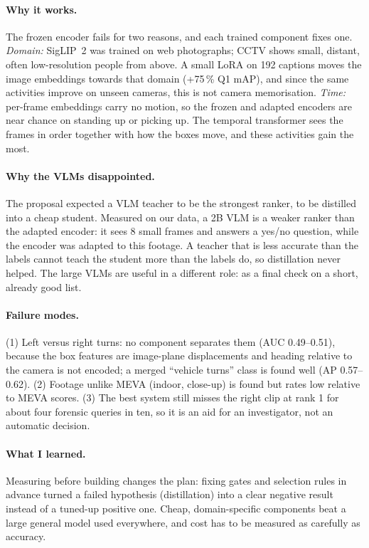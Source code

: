 \documentclass[11pt,a4paper]{article}
\begin{document}
\paragraph{Why it works.} The frozen encoder fails for two reasons, and each trained component fixes one.
\emph{Domain:} SigLIP~2 was trained on web photographs; CCTV shows small, distant, often low-resolution people from
above. A small LoRA on 192 captions moves the image embeddings towards that domain (+75\,\% Q1 mAP), and since the
same activities improve on unseen cameras, this is not camera memorisation. \emph{Time:} per-frame embeddings carry
no motion, so the frozen and adapted encoders are near chance on standing up or picking up. The temporal
transformer sees the frames in order together with how the boxes move, and these activities gain the most.

\paragraph{Why the VLMs disappointed.} The proposal expected a VLM teacher to be the strongest ranker, to be
distilled into a cheap student. Measured on our data, a 2B VLM is a weaker ranker than the adapted encoder: it
sees 8 small frames and answers a yes/no question, while the encoder was adapted to this footage. A teacher that is
less accurate than the labels cannot teach the student more than the labels do, so distillation never helped. The
large VLMs are useful in a different role: as a final check on a short, already good list.

\paragraph{Failure modes.} (1) Left versus right turns: no component separates them (AUC 0.49--0.51), because the
box features are image-plane displacements and heading relative to the camera is not encoded; a merged ``vehicle
turns'' class is found well (AP 0.57--0.62). (2) Footage unlike MEVA (indoor, close-up) is found but rates low
relative to MEVA scores. (3) The best system still misses the right clip at rank 1 for about four forensic queries
in ten, so it is an aid for an investigator, not an automatic decision.

\paragraph{What I learned.} Measuring before building changes the plan: fixing gates and selection rules in advance
turned a failed hypothesis (distillation) into a clear negative result instead of a tuned-up positive one. Cheap,
domain-specific components beat a large general model used everywhere, and cost has to be measured as carefully as
accuracy.
\end{document}
